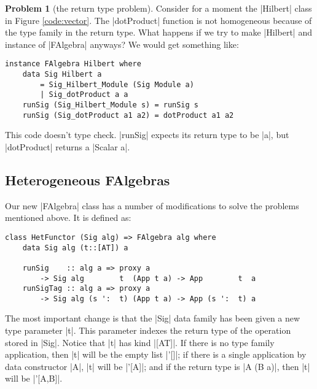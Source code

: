 \documentclass[preprint]{sigplanconf}
\theoremstyle{definition}
\newtheorem{problem}{Problem}
\begin{document}
\begin{problem}[the return type problem]
Consider for a moment the |Hilbert| class in Figure \ref{code:vector}.
The |dotProduct| function is not homogeneous because of the type family in the return type.
What happens if we try to make |Hilbert| and instance of |FAlgebra| anyways?
We would get something like:
\begin{lstlisting}
instance FAlgebra Hilbert where
    data Sig Hilbert a
        = Sig_Hilbert_Module (Sig Module a)
        | Sig_dotProduct a a
    runSig (Sig_Hilbert_Module s) = runSig s
    runSig (Sig_dotProduct a1 a2) = dotProduct a1 a2
\end{lstlisting}
This code doesn't type check.
|runSig| expects its return type to be |a|,
but |dotProduct| returns a |Scalar a|.
\end{problem}

\subsection{Heterogeneous FAlgebras}

Our new |FAlgebra| class has a number of modifications to solve the problems mentioned above.
It is defined as:
\begin{lstlisting}
class HetFunctor (Sig alg) => FAlgebra alg where
    data Sig alg (t::[AT]) a

    runSig    :: alg a => proxy a
        -> Sig alg        t  (App t a) -> App        t  a
    runSigTag :: alg a => proxy a
        -> Sig alg (s ':  t) (App t a) -> App (s ':  t) a
\end{lstlisting}

The most important change is that the |Sig| data family has been given a new type parameter |t|.
This parameter indexes the return type of the operation stored in |Sig|.
Notice that |t| has kind |[AT]|.
If there is no type family application, then |t| will be the empty list |'[]|;
if there is a single application by data constructor |A|, |t| will be |'[A]|;
and if the return type is |A (B a)|, then |t| will be |'[A,B]|.
\end{document}
